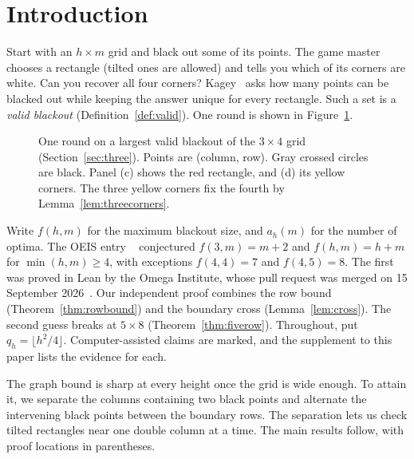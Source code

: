 \section{Introduction}\label{sec:intro}

Start with an $h\times m$ grid and black out some of its points.
The game master chooses a rectangle (tilted ones are allowed) and tells
you which of its corners are white. Can you recover all four corners?
Kagey~\cite{kageyG4G14,kagey001} asks how many points can be blacked out
while keeping the answer unique for every rectangle.
Such a set is a \emph{valid blackout} (Definition~\ref{def:valid}).
One round is shown in Figure~\ref{fig:game}.

\begin{figure}[t]
\centering
\resizebox{\textwidth}{!}{}
\caption{One round on a largest valid blackout of the $3\times4$ grid
(Section~\ref{sec:three}). Points are (column, row). Gray crossed circles are black. Panel (c) shows the red
rectangle, and (d) its yellow corners. The three yellow corners fix the fourth by
Lemma~\ref{lem:threecorners}.}
\label{fig:game}
\end{figure}

Write $f(h,m)$ for the maximum blackout size, and $a_h(m)$
for the number of optima. The OEIS entry ~\cite{oeis} conjectured
$f(3,m)=m+2$ and $f(h,m)=h+m$ for $\min(h,m)\ge4$, with exceptions
$f(4,4)=7$ and $f(4,5)=8$. The first was proved in Lean by the Omega
Institute, whose pull request was merged on 15 September
2026~\cite{trureturing2026}. Our independent proof combines the row
bound (Theorem~\ref{thm:rowbound}) and the boundary cross
(Lemma~\ref{lem:cross}). The second guess breaks at $5\times8$
(Theorem~\ref{thm:fiverow}). Throughout, put $q_h=\lfloor h^2/4\rfloor$.
Computer-assisted claims are marked, and the supplement to this paper lists the
evidence for each.

The graph bound is sharp at every height once the grid is wide enough.
To attain it, we separate the columns containing two black points and alternate
the intervening black points between the boundary rows. The separation lets us
check tilted rectangles near one double column at a time. The main results
follow, with proof locations in parentheses.

